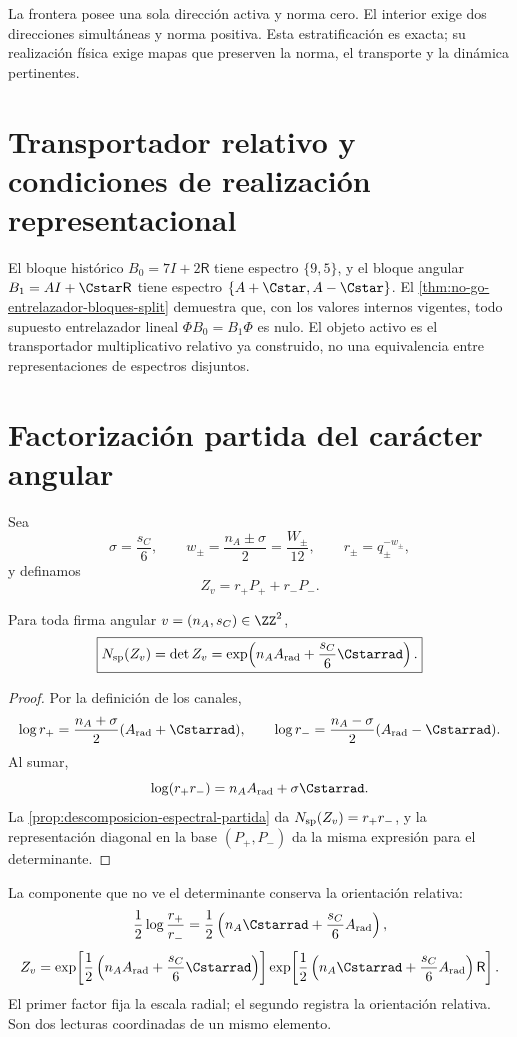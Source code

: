 La frontera posee una sola dirección activa y norma cero. El interior exige
dos direcciones simultáneas y norma positiva. Esta estratificación es exacta;
su realización física exige mapas que preserven la norma, el transporte y la
dinámica pertinentes.

\section{Transportador relativo y condiciones de realización representacional}
\label{sec:transportador-relativo-split-md}

El bloque histórico \(B_0=7I+2\mathsf R\) tiene espectro \(\{9,5\}\), y el
bloque angular \(B_1=AI+\Cstar\mathsf R\) tiene espectro
\(\{A+\Cstar,A-\Cstar\}\). El
\cref{thm:no-go-entrelazador-bloques-split} demuestra que, con los valores internos
vigentes, todo supuesto entrelazador lineal
\(\Phi B_0=B_1\Phi\) es nulo. El objeto activo es el transportador
multiplicativo relativo ya construido, no una equivalencia entre
representaciones de espectros disjuntos.

\section{Factorización partida del carácter angular}
\label{sec:factorizacion-split-angular}

Sea
\[
 \sigma=\frac{s_C}{6},\qquad
 w_\pm=\frac{n_A\pm\sigma}{2}=\frac{W_\pm}{12},
 \qquad
 r_\pm=q_\pm^{-w_\pm},
\]
y definamos
\[
 Z_v=r_+P_++r_-P_-.
\]

\begin{theorem}
\label{thm:split-character}
Para toda firma angular \(v=(n_A,s_C)\in\ZZ^2\),
\[
 \boxed{
 N_{\rm sp}(Z_v)
 =\det Z_v
 =\exp\!\left(
 n_AA_{\rm rad}+\frac{s_C}{6}\Cstarrad
 \right).}
\]
\end{theorem}

\begin{proof}
Por la definición de los canales,
\[
 \log r_+
 =\frac{n_A+\sigma}{2}(A_{\rm rad}+\Cstarrad),
 \qquad
 \log r_-
 =\frac{n_A-\sigma}{2}(A_{\rm rad}-\Cstarrad).
\]
Al sumar,
\[
 \log(r_+r_-)
 =n_AA_{\rm rad}+\sigma\Cstarrad.
\]
La \cref{prop:descomposicion-espectral-partida} da
\(N_{\rm sp}(Z_v)=r_+r_-\), y la representación diagonal en la base
\((P_+,P_-)\) da la misma expresión para el determinante.
\end{proof}

La componente que no ve el determinante conserva la orientación relativa:
\[
 \frac12\log\frac{r_+}{r_-}
 =\frac12\left(
 n_A\Cstarrad+\frac{s_C}{6}A_{\rm rad}
 \right),
\]
\[
 Z_v=
 \exp\!\left[
 \frac12\left(n_AA_{\rm rad}+\frac{s_C}{6}\Cstarrad\right)
 \right]
 \exp\!\left[
 \frac12\left(n_A\Cstarrad+\frac{s_C}{6}A_{\rm rad}\right)
 \mathsf R
 \right].
\]
El primer factor fija la escala radial; el segundo registra la orientación
relativa. Son dos lecturas coordinadas de un mismo elemento.

